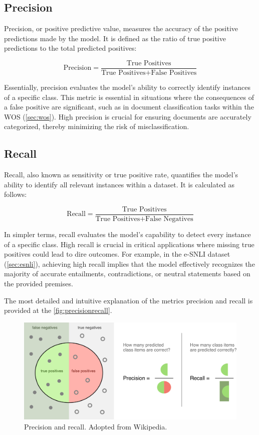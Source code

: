 \subsection{Precision}

Precision, or positive predictive value, measures the accuracy of the positive predictions made by the model. It is defined as the ratio of true positive predictions to the total predicted positives:

$$
    \text{Precision} = \frac{\text{True Positives}}{\text{True Positives} + \text{False Positives}}
$$

Essentially, precision evaluates the model's ability to correctly identify instances of a specific class. This metric is essential in situations where the consequences of a false positive are significant, such as in document classification tasks within the WOS (\autoref{sec:wos}). High precision is crucial for ensuring documents are accurately categorized, thereby minimizing the risk of misclassification. 

\subsection{Recall}

Recall, also known as sensitivity or true positive rate, quantifies the model's ability to identify all relevant instances within a dataset. It is calculated as follows:

$$
    \text{Recall} = \frac{\text{True Positives}}{\text{True Positives} + \text{False Negatives}}
$$

In simpler terms, recall evaluates the model's capability to detect every instance of a specific class. High recall is crucial in critical applications where missing true positives could lead to dire outcomes. For example, in the e-SNLI dataset (\autoref{sec:esnli}), achieving high recall implies that the model effectively recognizes the majority of accurate entailments, contradictions, or neutral statements based on the provided premises.

The most detailed and intuitive explanation of the metrics precision and recall is provided at the \autoref{fig:precisionrecall}.

\begin{figure}[h!]
    \centering
    \includegraphics[width=0.9\linewidth]{figs/precisionrecall.jpg}
    \caption[Precision and recall]{Precision and recall. Adopted from Wikipedia\protect\footnotemark.}
    \label{fig:precisionrecall}
\end{figure}



